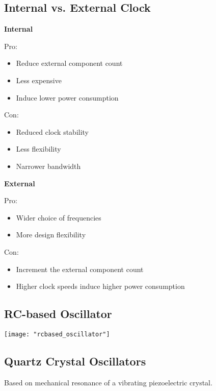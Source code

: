 \subsection{Internal vs. External Clock }

\begin{minipage}[t]{0.5\columnwidth}
	\textbf{Internal}
	
	Pro:
	\begin{itemize}
		\itemsep-.5em 
		\item Reduce external component count
		\item Less expensive
		\item Induce lower power consumption
	\end{itemize}
	Con:
	\begin{itemize}
		\itemsep-.5em 
		\item Reduced clock stability
		\item Less flexibility
		\item Narrower bandwidth
	\end{itemize}
\end{minipage}
\begin{minipage}[t]{0.5\columnwidth}
	\textbf{External}
	
	Pro:
	\begin{itemize}
		\itemsep-.5em 
		\item Wider choice of frequencies
		\item More design flexibility
	\end{itemize}
	Con:
	\begin{itemize}
		\itemsep-.5em 
		\item Increment the external component count
		\item Higher clock speeds induce higher power
		consumption
	\end{itemize}
\end{minipage}
\vspace{2mm}

\subsection{RC-based Oscillator}
\texttt{[image: "rcbased\_oscillator"]}

\subsection{Quartz Crystal Oscillators }
Based on mechanical resonance of a vibrating piezoelectric crystal.

